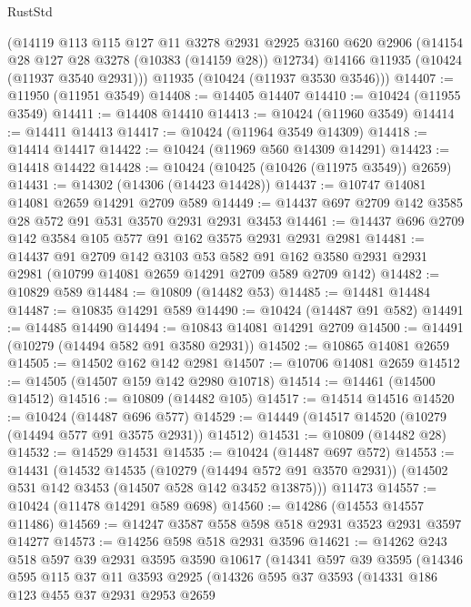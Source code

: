 \begin{lexlean}{RustStd}
\begin{coremodule}
      (@14119
        @113
        @115
        @127
        @11
        @3278
        @2931
        @2925
        @3160
        @620
        @2906
        (@14154 @28 @127 @28 @3278 (@10383 (@14159 @28)) @12734)
        @14166
        @11935
        (@10424 (@11937 @3540 @2931)))
      @11935
      (@10424 (@11937 @3530 @3546)))
@14407 := @11950 (@11951 @3549)
@14408 := @14405 @14407
@14410 := @10424 (@11955 @3549)
@14411 := @14408 @14410
@14413 := @10424 (@11960 @3549)
@14414 := @14411 @14413
@14417 := @10424 (@11964 @3549 @14309)
@14418 := @14414 @14417
@14422 := @10424 (@11969 @560 @14309 @14291)
@14423 := @14418 @14422
@14428 := @10424 (@10425 (@10426 (@11975 @3549)) @2659)
@14431 := @14302 (@14306 (@14423 @14428))
@14437 := @10747 @14081 @14081 @2659 @14291 @2709 @589
@14449 := @14437 @697 @2709 @142 @3585 @28 @572 @91 @531 @3570 @2931 @2931 @3453
@14461 := @14437 @696 @2709 @142 @3584 @105 @577 @91 @162 @3575 @2931 @2931 @2981
@14481 := @14437
    @91
    @2709
    @142
    @3103
    @53
    @582
    @91
    @162
    @3580
    @2931
    @2931
    @2981
    (@10799 @14081 @2659 @14291 @2709 @589 @2709 @142)
@14482 := @10829 @589
@14484 := @10809 (@14482 @53)
@14485 := @14481 @14484
@14487 := @10835 @14291 @589
@14490 := @10424 (@14487 @91 @582)
@14491 := @14485 @14490
@14494 := @10843 @14081 @14291 @2709
@14500 := @14491 (@10279 (@14494 @582 @91 @3580 @2931))
@14502 := @10865 @14081 @2659
@14505 := @14502 @162 @142 @2981
@14507 := @10706 @14081 @2659
@14512 := @14505 (@14507 @159 @142 @2980 @10718)
@14514 := @14461 (@14500 @14512)
@14516 := @10809 (@14482 @105)
@14517 := @14514 @14516
@14520 := @10424 (@14487 @696 @577)
@14529 := @14449 (@14517 @14520 (@10279 (@14494 @577 @91 @3575 @2931)) @14512)
@14531 := @10809 (@14482 @28)
@14532 := @14529 @14531
@14535 := @10424 (@14487 @697 @572)
@14553 := @14431
    (@14532
      @14535
      (@10279 (@14494 @572 @91 @3570 @2931))
      (@14502 @531 @142 @3453 (@14507 @528 @142 @3452 @13875)))
    @11473
@14557 := @10424 (@11478 @14291 @589 @698)
@14560 := @14286 (@14553 @14557 @11486)
@14569 := @14247 @3587 @558 @598 @518 @2931 @3523 @2931 @3597 @14277
@14573 := @14256 @598 @518 @2931 @3596
@14621 := @14262
    @243
    @518
    @597
    @39
    @2931
    @3595
    @3590
    @10617
    (@14341
      @597
      @39
      @3595
      (@14346
        @595
        @115
        @37
        @11
        @3593
        @2925
        (@14326
          @595
          @37
          @3593
          (@14331
            @186
            @123
            @455
            @37
            @2931
            @2953
            @2659

\end{coremodule}
\end{lexlean}
